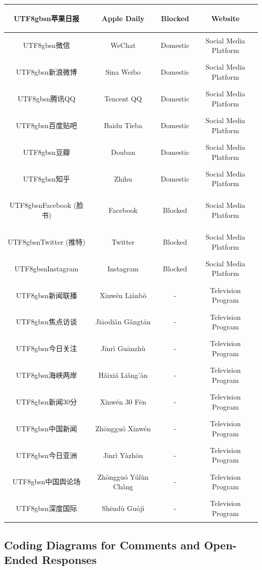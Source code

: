 \documentclass[11pt]{article}
\newcommand{\zh}[1]{\begin{CJK*}{UTF8}{gbsn}#1\end{CJK*}}
\begin{document}
\begin{table}[H]
{\begin{tabular}{|c|c|c|c|}
        \zh{苹果日报} & Apple Daily & Blocked & Website \\ \hline
        \zh{微信} & WeChat & Domestic & Social Media Platform \\ \hline
        \zh{新浪微博} & Sina Weibo & Domestic & Social Media Platform \\ \hline
        \zh{腾讯QQ} & Tencent QQ & Domestic & Social Media Platform \\ \hline
        \zh{百度贴吧} & Baidu Tieba & Domestic & Social Media Platform \\ \hline
        \zh{豆瓣} & Douban & Domestic & Social Media Platform \\ \hline
        \zh{知乎} & Zhihu & Domestic & Social Media Platform \\ \hline
        \zh{Facebook (脸书)} & Facebook & Blocked & Social Media Platform \\ \hline
        \zh{Twitter (推特)} & Twitter & Blocked & Social Media Platform \\ \hline
        \zh{Instagram} & Instagram & Blocked & Social Media Platform \\ \hline
        \zh{新闻联播} & Xīnwén Liánbò & - & Television Program \\ \hline
        \zh{焦点访谈} & Jiāodiǎn Gǎngtán & - & Television Program \\ \hline
        \zh{今日关注} & Jīnrì Guānzhù & - & Television Program \\ \hline
        \zh{海峡两岸} & Hǎixiá Liǎng'àn & - & Television Program \\ \hline
        \zh{新闻30分} & Xīnwén 30 Fēn & - & Television Program \\ \hline
        \zh{中国新闻} & Zhōngguó Xīnwén & - & Television Program \\ \hline
        \zh{今日亚洲} & Jīnrì Yàzhōu & - & Television Program \\ \hline
        \zh{中国舆论场} & Zhōngguó Yúlùn Chǎng & - & Television Program \\ \hline
        \zh{深度国际} & Shēndù Guójì & - & Television Program \\ \hline
  \end{tabular}
  }
  \label{exposure}
\end{table}

\newpage

\subsection{Coding Diagrams for Comments and Open-Ended Responses}\label{diags}
\end{document}
